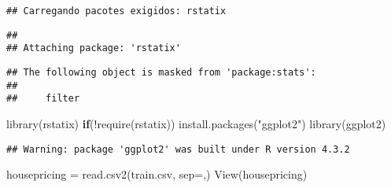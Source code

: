 \documentclass[
]{article}
\newenvironment{Shaded}{\begin{snugshade}}{\end{snugshade}}
\newcommand{\AttributeTok}[1]{\textcolor[rgb]{0.77,0.63,0.00}{#1}}
\newcommand{\ControlFlowTok}[1]{\textcolor[rgb]{0.13,0.29,0.53}{\textbf{#1}}}
\newcommand{\DocumentationTok}[1]{\textcolor[rgb]{0.56,0.35,0.01}{\textbf{\textit{#1}}}}
\newcommand{\FloatTok}[1]{\textcolor[rgb]{0.00,0.00,0.81}{#1}}
\newcommand{\FunctionTok}[1]{\textcolor[rgb]{0.00,0.00,0.00}{#1}}
\newcommand{\NormalTok}[1]{#1}
\newcommand{\OtherTok}[1]{\textcolor[rgb]{0.56,0.35,0.01}{#1}}
\newcommand{\SpecialCharTok}[1]{\textcolor[rgb]{0.00,0.00,0.00}{#1}}
\newcommand{\StringTok}[1]{\textcolor[rgb]{0.31,0.60,0.02}{#1}}
\begin{document}
\begin{verbatim}
## Carregando pacotes exigidos: rstatix
\end{verbatim}

\begin{verbatim}
## 
## Attaching package: 'rstatix'
\end{verbatim}

\begin{verbatim}
## The following object is masked from 'package:stats':
## 
##     filter
\end{verbatim}

\begin{Shaded}
\begin{Highlighting}[]
\FunctionTok{library}\NormalTok{(rstatix)}
\ControlFlowTok{if}\NormalTok{(}\SpecialCharTok{!}\FunctionTok{require}\NormalTok{(rstatix)) }\FunctionTok{install.packages}\NormalTok{(}\StringTok{"ggplot2"}\NormalTok{)}
\FunctionTok{library}\NormalTok{(ggplot2)}
\end{Highlighting}
\end{Shaded}

\begin{verbatim}
## Warning: package 'ggplot2' was built under R version 4.3.2
\end{verbatim}

\begin{Shaded}
\begin{Highlighting}[]
\NormalTok{housepricing }\OtherTok{=} \FunctionTok{read.csv2}\NormalTok{(}\StringTok{\textquotesingle{}train.csv\textquotesingle{}}\NormalTok{, }\AttributeTok{sep=}\StringTok{\textquotesingle{},\textquotesingle{}}\NormalTok{)}
\FunctionTok{View}\NormalTok{(housepricing)}
\end{Highlighting}
\end{Shaded}

\begin{Shaded}
\end{Shaded}
\end{document}
